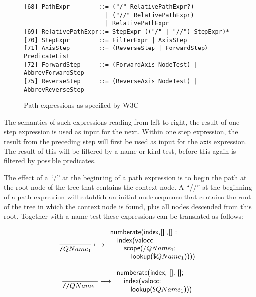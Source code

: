\begin{figure}[h]
\begin{Verbatim}
[68] PathExpr        ::= ("/" RelativePathExpr?)
                       | ("//" RelativePathExpr)
                       | RelativePathExpr
[69] RelativePathExpr::= StepExpr (("/" | "//") StepExpr)*
[70] StepExpr        ::= FilterExpr | AxisStep
[71] AxisStep        ::= (ReverseStep | ForwardStep) PredicateList
[72] ForwardStep     ::= (ForwardAxis NodeTest) | AbbrevForwardStep
[75] ReverseStep     ::= (ReverseAxis NodeTest) | AbbrevReverseStep
\end{Verbatim}
\label{fig:trans:TD:pathEBNF}
\caption{Path expressions as specified by W3C}
\end{figure}
The semantics of such expressions reading from left to right, the result of one step expression is used as input
for the next. Within one step expression, the result from the preceding step will first be used as input for the
axis expression. The result of this will be filtered by a name or kind test, before this again is filtered by
possible predicates.

The effect of a ``/'' at the beginning of a path expression is to begin the path at the root node of the tree that
contains the context node. A ``//'' at the beginning of a path expression will establish an initial node sequence
that contains the root of the tree in which the context node is found, plus all nodes descended from this root.
Together with a name test these expressions can be translated as follows:

\begin{equation}
\frac{}{\mbox{\texttt{/}}QName_{1}}\longmapsto
\begin{array}{l}
\mbox{\textsf{numberate(index,[] ,[] ;}} \\ \quad
\mbox{\textsf{index(valocc;}} \\ \quad \quad
\mbox{\textsf{scope(/}}QName_{1}\mbox{\textsf{;}} \\ \quad\quad\quad
\mbox{\textsf{lookup(\$}}QName_{1}\mbox{\textsf{))))}}
\end{array}
\label{rule:trans:TD:sglSlash}
\end{equation}

\begin{equation}
\frac{}{\mbox{\texttt{//}}QName_{1}}\longmapsto
\begin{array}{l}
\mbox{\textsf{numberate(index, [], [];}} \\ \quad
\mbox{\textsf{index(valocc;}} \\ \quad \quad
\mbox{\textsf{lookup(\$}}QName_1\mbox{\textsf{)))}}
\end{array}
\label{rule:trans:TD:dblSlash}
\end{equation}

